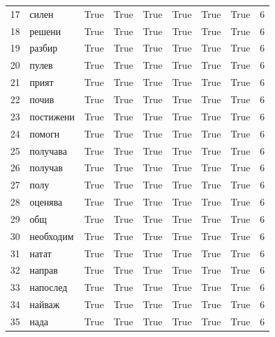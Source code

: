 \begin{longtable}{rlllllllr}
  17 &       силен &     True &   True &   True &       True &           True &      True &      6 \\
  18 &      решени &     True &   True &   True &       True &           True &      True &      6 \\
  19 &      разбир &     True &   True &   True &       True &           True &      True &      6 \\
  20 &       пулев &     True &   True &   True &       True &           True &      True &      6 \\
  21 &       прият &     True &   True &   True &       True &           True &      True &      6 \\
  22 &       почив &     True &   True &   True &       True &           True &      True &      6 \\
  23 &   постижени &     True &   True &   True &       True &           True &      True &      6 \\
  24 &      помогн &     True &   True &   True &       True &           True &      True &      6 \\
  25 &    получава &     True &   True &   True &       True &           True &      True &      6 \\
  26 &     получав &     True &   True &   True &       True &           True &      True &      6 \\
  27 &        полу &     True &   True &   True &       True &           True &      True &      6 \\
  28 &     оценява &     True &   True &   True &       True &           True &      True &      6 \\
  29 &         общ &     True &   True &   True &       True &           True &      True &      6 \\
  30 &   необходим &     True &   True &   True &       True &           True &      True &      6 \\
  31 &       натат &     True &   True &   True &       True &           True &      True &      6 \\
  32 &      направ &     True &   True &   True &       True &           True &      True &      6 \\
  33 &    напослед &     True &   True &   True &       True &           True &      True &      6 \\
  34 &      найваж &     True &   True &   True &       True &           True &      True &      6 \\
  35 &        нада &     True &   True &   True &       True &           True &      True &      6 \\

\end{longtable}
